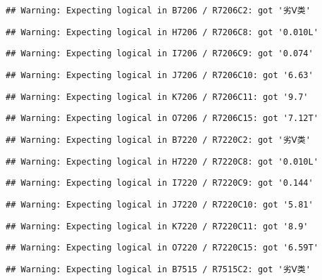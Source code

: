 \documentclass[
]{article}
\begin{document}
\begin{verbatim}
## Warning: Expecting logical in B7206 / R7206C2: got '劣Ⅴ类'
\end{verbatim}

\begin{verbatim}
## Warning: Expecting logical in H7206 / R7206C8: got '0.010L'
\end{verbatim}

\begin{verbatim}
## Warning: Expecting logical in I7206 / R7206C9: got '0.074'
\end{verbatim}

\begin{verbatim}
## Warning: Expecting logical in J7206 / R7206C10: got '6.63'
\end{verbatim}

\begin{verbatim}
## Warning: Expecting logical in K7206 / R7206C11: got '9.7'
\end{verbatim}

\begin{verbatim}
## Warning: Expecting logical in O7206 / R7206C15: got '7.12T'
\end{verbatim}

\begin{verbatim}
## Warning: Expecting logical in B7220 / R7220C2: got '劣Ⅴ类'
\end{verbatim}

\begin{verbatim}
## Warning: Expecting logical in H7220 / R7220C8: got '0.010L'
\end{verbatim}

\begin{verbatim}
## Warning: Expecting logical in I7220 / R7220C9: got '0.144'
\end{verbatim}

\begin{verbatim}
## Warning: Expecting logical in J7220 / R7220C10: got '5.81'
\end{verbatim}

\begin{verbatim}
## Warning: Expecting logical in K7220 / R7220C11: got '8.9'
\end{verbatim}

\begin{verbatim}
## Warning: Expecting logical in O7220 / R7220C15: got '6.59T'
\end{verbatim}

\begin{verbatim}
## Warning: Expecting logical in B7515 / R7515C2: got '劣Ⅴ类'
\end{verbatim}
\end{document}
